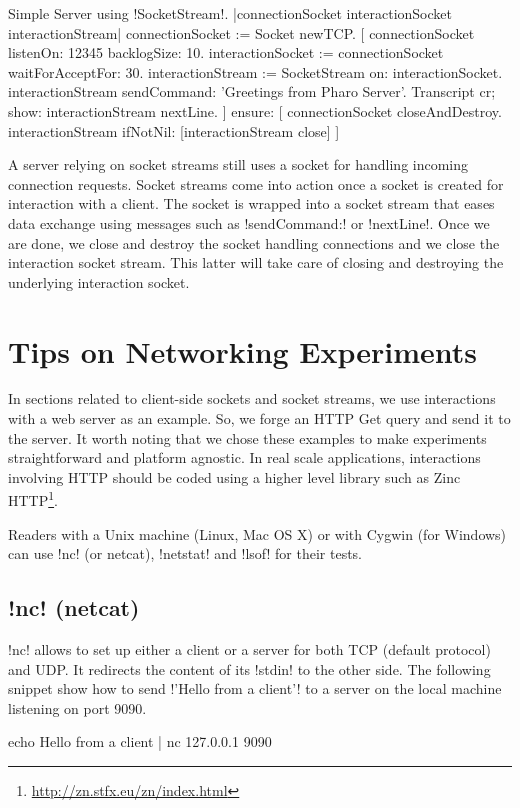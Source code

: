 \documentclass[a4paper,10pt,twoside]{book}
\begin{document}
\begin{script}{Simple Server using \ct!SocketStream!.}
|connectionSocket interactionSocket interactionStream|
connectionSocket := Socket newTCP. 
[
	connectionSocket listenOn: 12345 backlogSize: 10. 
	interactionSocket := connectionSocket waitForAcceptFor: 30. 
	interactionStream := SocketStream on: interactionSocket.
	interactionStream sendCommand: 'Greetings from Pharo Server'.
	Transcript cr; show: interactionStream nextLine.
] ensure: [
	connectionSocket closeAndDestroy.
	interactionStream ifNotNil: [interactionStream close]
]
\end{script}

A server relying on socket streams still uses a socket for handling incoming connection requests.
Socket streams come into action once a socket is created for interaction with a client.
The socket is wrapped into a socket stream that eases data exchange using messages such as \ct!sendCommand:! or \ct!nextLine!.
Once we are done, we close and destroy the socket handling connections and we close the interaction socket stream.
This latter will take care of closing and destroying the underlying interaction socket.

\section{Tips on Networking Experiments}
In sections related to client-side sockets and socket streams, we use interactions with a web server as an example.
So, we forge an HTTP Get query and send it to the server.
It  worth noting that we chose these examples to make experiments straightforward and platform agnostic.
In real scale applications, interactions involving HTTP should be coded using a higher level library such as Zinc HTTP\footnote{\url{http://zn.stfx.eu/zn/index.html}}.

Readers with a Unix machine (Linux, Mac OS X) or with Cygwin (for Windows) can use \ct!nc! (or netcat), \ct!netstat! and \ct!lsof! for their tests.

\subsection{\ct!nc! (netcat)}
\ct!nc! allows to set up either a client or a server for both TCP (default protocol) and UDP.
It redirects the content of its \ct!stdin! to the other side.
The following snippet show how to send \ct!'Hello from a client'! to a server on the local machine listening on port 9090.
\begin{code}{}
echo Hello from a client | nc 127.0.0.1 9090 
\end{code}
\end{document}

